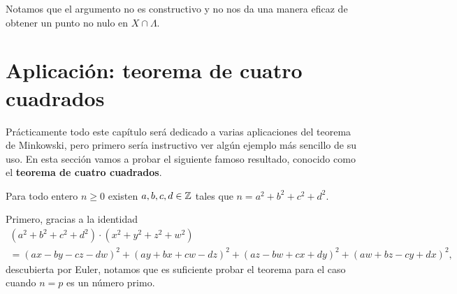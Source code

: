 Notamos que el argumento no es constructivo y no nos da una manera eficaz de
obtener un punto no nulo en $X \cap \Lambda$.


\section{Aplicación: teorema de cuatro cuadrados}

Prácticamente todo este capítulo será dedicado a varias aplicaciones del teorema
de Minkowski, pero primero sería instructivo ver algún ejemplo más sencillo de
su uso. En esta sección vamos a probar el siguiente famoso resultado, conocido
como el \textbf{teorema de cuatro cuadrados}.

\begin{teorema}[Lagrange]
  Para todo entero $n \ge 0$ existen $a,b,c,d \in \mathbb{Z}$ tales que
  $n = a^2 + b^2 + c^2 + d^2$.
\end{teorema}

Primero, gracias a la identidad
\begin{multline*}
  (a^2 + b^2 + c^2 + d^2)\cdot (x^2 + y^2 + z^2 + w^2) \\
  = (a x - b y - c z - d w)^2 +
    (a y + b x + c w - d z)^2 +
    (a z - b w + c x + d y)^2 +
    (a w + b z - c y + d x)^2,
\end{multline*}
descubierta por Euler, notamos que es suficiente probar el teorema para el caso
cuando $n = p$ es un número primo.


